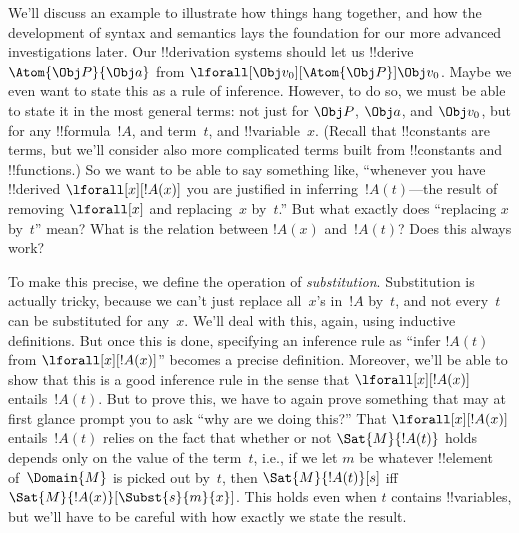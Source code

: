 \documentclass[../../../include/open-logic-section]{subfiles}
\begin{document}


We'll discuss an example to illustrate how things hang together, and
how the development of syntax and semantics lays the foundation for
our more advanced investigations later. Our !!{derivation} systems should let
us !!{derive} $\Atom{\Obj P}{\Obj a}$ from $\lforall[\Obj
v_0][\Atom{\Obj P}]{\Obj v_0}$. Maybe we even want to state this as a
rule of inference. However, to do so, we must be able to state it in
the most general terms: not just for $\Obj P$, $\Obj a$, and $\Obj
v_0$, but for any !!{formula}~$!A$, and term~$t$, and
!!{variable}~$x$. (Recall that !!{constant}s are terms, but we'll
consider also more complicated terms built from !!{constant}s and
!!{function}s.) So we want to be able to say something like,
``whenever you have !!{derive}d $\lforall[x][!A(x)]$ you are justified
in inferring~$!A(t)$---the result of removing $\lforall[x]$ and
replacing~$x$ by~$t$.'' But what exactly does ``replacing $x$ by~$t$''
mean? What is the relation between $!A(x)$ and~$!A(t)$?  Does this
always work?

To make this precise, we define the operation of \emph{substitution}.
Substitution is actually tricky, because we can't just replace
all~$x$'s in~$!A$ by~$t$, and not every~$t$ can be substituted for
any~$x$. We'll deal with this, again, using inductive definitions. But
once this is done, specifying an inference rule as ``infer $!A(t)$
from $\lforall[x][!A(x)]$'' becomes a precise definition.  Moreover,
we'll be able to show that this is a good inference rule in the sense
that $\lforall[x][!A(x)]$ entails~$!A(t)$. But to prove this, we have
to again prove something that may at first glance prompt you to ask
``why are we doing this?'' That $\lforall[x][!A(x)]$ entails~$!A(t)$
relies on the fact that whether or not $\Sat{M}{!A(t)}$ holds depends
only on the value of the term~$t$, i.e., if we let $m$ be whatever
!!{element} of~$\Domain{M}$ is picked out by~$t$, then
$\Sat{M}{!A(t)}[s]$ iff $\Sat{M}{!A(x)}[\Subst{s}{m}{x}]$. This holds
even when $t$ contains !!{variable}s, but we'll have to be careful
with how exactly we state the result.
\end{document}
